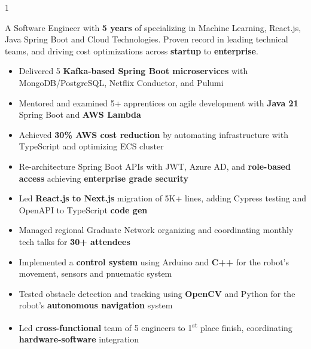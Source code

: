 \documentclass[11pt,a4paper,ragged2e]{altacv}
\begin{document}
\begin{paracol}{1}
\smallskip
{}

A Software Engineer with \textbf{5 years} of specializing in Machine Learning, React.js, Java Spring Boot and Cloud Technologies. Proven record in leading technical teams, and driving cost optimizations across \textbf{startup} to \textbf{enterprise}.


\begin{itemize}
\item Delivered 5 \textbf{Kafka-based Spring Boot microservices} with MongoDB/PostgreSQL, Netflix Conductor, and Pulumi
\item Mentored and examined 5+ apprentices on agile development with \textbf{Java 21} Spring Boot and \textbf{AWS Lambda}
\item Achieved \textbf{30\% AWS cost reduction} by automating infrastructure with TypeScript and optimizing ECS cluster
\item Re-architecture Spring Boot APIs with JWT, Azure AD, and \textbf{role-based access} achieving \textbf{enterprise grade security}
\item Led \textbf{React.js to Next.js} migration of 5K+ lines, adding Cypress testing and OpenAPI to TypeScript \textbf{code gen}
\item Managed regional Graduate Network organizing and coordinating monthly tech talks for \textbf{30+ attendees}
\end{itemize}
\tightdivider

\begin{itemize}
\item Implemented a  \textbf{control system} using Arduino and \textbf{C++} for the robot's movement, sensors and pnuematic system
\item Tested obstacle detection and tracking using \textbf{OpenCV} and Python for the robot's \textbf{autonomous navigation} system
\item Led \textbf{cross-functional} team of 5 engineers to 1\textsuperscript{st} place finish, coordinating \textbf{hardware-software} integration
\end{itemize}
\tightdivider


\end{paracol}
\end{document}
